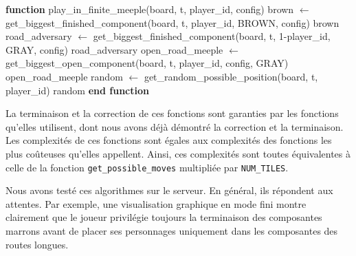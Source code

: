 \begin{algorithm}[H]
\caption{play\_in\_finite\_meeple}
\begin{algorithmic}[1]
\STATE \textbf{function} play\_in\_finite\_meeple(board, t, player\_id, config)
    \STATE brown $\gets$ get\_biggest\_finished\_component(board, t, player\_id, BROWN, config)
        \RETURN brown
    \ENDIF
        \STATE road\_adversary $\gets$ get\_biggest\_finished\_component(board, t, 1-player\_id, GRAY, config)
            \RETURN road\_adversary
        \ENDIF
    \ELSE
        \STATE open\_road\_meeple $\gets$ get\_biggest\_open\_component(board, t, player\_id, config, GRAY)
            \RETURN open\_road\_meeple
        \ENDIF
    \ENDIF
    \STATE random $\gets$ get\_random\_possible\_position(board, t, player\_id)
    \RETURN random
\STATE \textbf{end function}
\end{algorithmic}
\end{algorithm}

La terminaison et la correction de ces fonctions sont garanties par les fonctions qu'elles utilisent, dont nous avons déjà démontré la correction et la terminaison. Les complexités de ces fonctions sont égales aux complexités des fonctions les plus coûteuses qu'elles appellent. Ainsi, ces complexités sont toutes équivalentes à celle de la fonction \texttt{get\_possible\_moves} multipliée par \texttt{NUM\_TILES}.

Nous avons testé ces algorithmes sur le serveur. En général, ils répondent aux attentes. Par exemple, une visualisation graphique en mode fini montre clairement que le joueur privilégie toujours la terminaison des composantes marrons avant de placer ses personnages uniquement dans les composantes des routes longues.






































